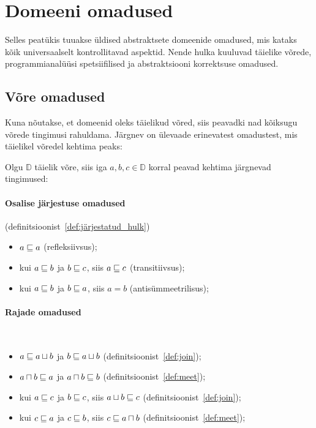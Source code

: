 \documentclass[../thesis.tex]{subfiles}
\begin{document}
\section{Domeeni omadused}
Selles peatükis tuuakse üldised abstraktsete domeenide omadused, mis kataks kõik universaalselt kontrollitavad aspektid. Nende hulka kuuluvad täielike võrede, programmianalüüsi spetsiifilised ja abstraktsiooni korrektsuse omadused.

\subsection{Võre omadused}
\label{sec:lattice-props}
Kuna nõutakse, et domeenid oleks täielikud võred, siis peavadki nad kõiksugu võrede tingimusi rahuldama. Järgnev on ülevaade erinevatest omadustest, mis täielikel võredel kehtima peaks:

\noindent
Olgu $\mathbb{D}$ täielik võre, siis iga $a, b, c \in \mathbb{D}$ korral peavad kehtima järgnevad tingimused:

\paragraph{Osalise järjestuse omadused} (definitsioonist~\ref{def:järjestatud_hulk})
\begin{itemize}[nosep]
	\item $a \sqsubseteq a$ (refleksiivsus);
	\item kui $a \sqsubseteq b$ ja $b \sqsubseteq c$, siis $a \sqsubseteq c$ (transitiivsus);
	\item kui $a \sqsubseteq b$ ja $b \sqsubseteq a$, siis $a = b$ (antisümmeetrilisus);
\end{itemize}

\paragraph{Rajade omadused}~\cite{might_orders}
\begin{itemize}[nosep]
	\item $a \sqsubseteq a \sqcup b$ ja $b \sqsubseteq a \sqcup b$ (definitsioonist~\ref{def:join});
	\item $a \sqcap b \sqsubseteq a$ ja $a \sqcap b \sqsubseteq b$ (definitsioonist~\ref{def:meet});
	\item kui $a \sqsubseteq c$ ja $b \sqsubseteq c$, siis $a \sqcup b \sqsubseteq c$ (definitsioonist~\ref{def:join});
	\item kui $c \sqsubseteq a$ ja $c \sqsubseteq b$, siis $c \sqsubseteq a \sqcap b$ (definitsioonist~\ref{def:meet});
\end{itemize}
\end{document}
